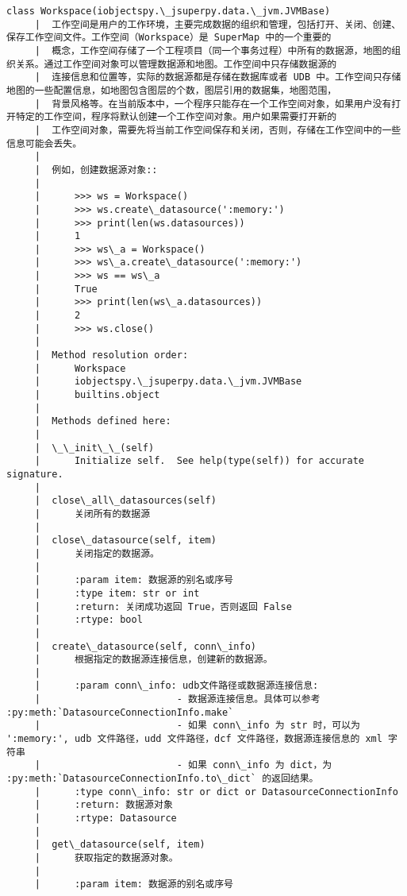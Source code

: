 \documentclass[11pt]{article}
\begin{document}
\begin{Verbatim}[commandchars=\\\{\}]
    class Workspace(iobjectspy.\_jsuperpy.data.\_jvm.JVMBase)
     |  工作空间是用户的工作环境，主要完成数据的组织和管理，包括打开、关闭、创建、保存工作空间文件。工作空间（Workspace）是 SuperMap 中的一个重要的
     |  概念，工作空间存储了一个工程项目（同一个事务过程）中所有的数据源，地图的组织关系。通过工作空间对象可以管理数据源和地图。工作空间中只存储数据源的
     |  连接信息和位置等，实际的数据源都是存储在数据库或者 UDB 中。工作空间只存储地图的一些配置信息，如地图包含图层的个数，图层引用的数据集，地图范围，
     |  背景风格等。在当前版本中，一个程序只能存在一个工作空间对象，如果用户没有打开特定的工作空间，程序将默认创建一个工作空间对象。用户如果需要打开新的
     |  工作空间对象，需要先将当前工作空间保存和关闭，否则，存储在工作空间中的一些信息可能会丢失。
     |  
     |  例如，创建数据源对象::
     |  
     |      >>> ws = Workspace()
     |      >>> ws.create\_datasource(':memory:')
     |      >>> print(len(ws.datasources))
     |      1
     |      >>> ws\_a = Workspace()
     |      >>> ws\_a.create\_datasource(':memory:')
     |      >>> ws == ws\_a
     |      True
     |      >>> print(len(ws\_a.datasources))
     |      2
     |      >>> ws.close()
     |  
     |  Method resolution order:
     |      Workspace
     |      iobjectspy.\_jsuperpy.data.\_jvm.JVMBase
     |      builtins.object
     |  
     |  Methods defined here:
     |  
     |  \_\_init\_\_(self)
     |      Initialize self.  See help(type(self)) for accurate signature.
     |  
     |  close\_all\_datasources(self)
     |      关闭所有的数据源
     |  
     |  close\_datasource(self, item)
     |      关闭指定的数据源。
     |      
     |      :param item: 数据源的别名或序号
     |      :type item: str or int
     |      :return: 关闭成功返回 True，否则返回 False
     |      :rtype: bool
     |  
     |  create\_datasource(self, conn\_info)
     |      根据指定的数据源连接信息，创建新的数据源。
     |      
     |      :param conn\_info: udb文件路径或数据源连接信息:
     |                        - 数据源连接信息。具体可以参考 :py:meth:`DatasourceConnectionInfo.make`
     |                        - 如果 conn\_info 为 str 时，可以为 ':memory:', udb 文件路径，udd 文件路径，dcf 文件路径，数据源连接信息的 xml 字符串
     |                        - 如果 conn\_info 为 dict，为  :py:meth:`DatasourceConnectionInfo.to\_dict` 的返回结果。
     |      :type conn\_info: str or dict or DatasourceConnectionInfo
     |      :return: 数据源对象
     |      :rtype: Datasource
     |  
     |  get\_datasource(self, item)
     |      获取指定的数据源对象。
     |      
     |      :param item: 数据源的别名或序号

\end{Verbatim}
\end{document}
